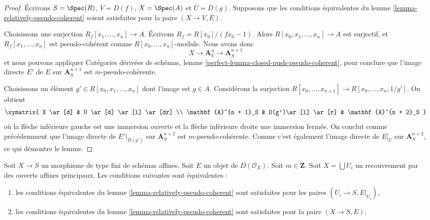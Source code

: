 \begin{proof}
Écrivons $S = \Spec(R)$, $V = D(f)$, $X = \Spec(A)$ et $U = D(g)$.
Supposons que les conditions équivalentes du
lemme \ref{lemma-relatively-pseudo-coherent}
soient satisfaites pour la paire $(X \to V, E)$.

\medskip\noindent
Choisissons une surjection $R_f[x_1, \ldots, x_n] \to A$. Écrivons
$R_f = R[x_0]/(fx_0 - 1)$. Alors $R[x_0, x_1, \ldots, x_n] \to A$
est surjectif, et $R_f[x_1, \ldots, x_n]$ est pseudo-cohérent comme
$R[x_0, \ldots, x_n]$-module. Nous avons donc
$$
X \to \mathbf{A}^n_V \to \mathbf{A}^{n + 1}_S
$$
et nous pouvons appliquer
Catégories dérivées de schémas,
lemme \ref{perfect-lemma-closed-push-pseudo-coherent},
pour conclure que l'image directe $E'$ de $E$ sur $\mathbf{A}^{n + 1}_S$
est $m$-pseudo-cohérente.

\medskip\noindent
Choisissons un élément $g' \in R[x_0, x_1, \ldots, x_n]$ dont l'image est
$g \in A$. Considérons la surjection
$R[x_0, \ldots, x_{n + 1}] \to R[x_0, \ldots, x_n, 1/g']$.
On obtient
$$
\xymatrix{
X \ar[d] & U \ar[d] \ar[l] \ar[dr] \\
\mathbf{A}^{n + 1}_S & D(g')\ar[l] \ar[r] & \mathbf{A}^{n + 2}_S
}
$$
où la flèche inférieure gauche est une immersion ouverte et la flèche inférieure droite
une immersion fermée. On conclut comme précédemment que l'image directe de
$E'|_{D(g')}$ sur $\mathbf{A}^{n + 2}_S$ est $m$-pseudo-cohérente.
Comme c'est également l'image directe de $E|_U$ sur $\mathbf{A}^{n + 2}_S$,
ce qui démontre le lemme.
\end{proof}

\begin{lemma}
\label{lemma-glue-relative-pseudo-coherent}
Soit $X \to S$ un morphisme de type fini de schémas affines. Soit $E$ un
objet de $D(\mathcal{O}_X)$. Soit $m \in \mathbf{Z}$.
Soit $X = \bigcup U_i$ un recouvrement par des ouverts affines principaux.
Les conditions suivantes sont équivalentes :
\begin{enumerate}
\item les conditions équivalentes du
lemme \ref{lemma-relatively-pseudo-coherent}
sont satisfaites pour les paires $(U_i \to S, E|_{U_i})$,
\item les conditions équivalentes du
lemme \ref{lemma-relatively-pseudo-coherent}
sont satisfaites pour la paire $(X \to S, E)$.
\end{enumerate}
\end{lemma}

